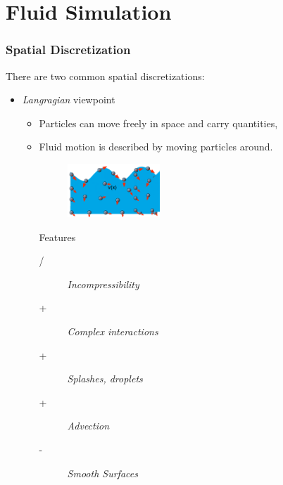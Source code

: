 \part{Fluid Simulation}
\begin{multicols}{2}
\section{Spatial Discretization}
There are two common spatial discretizations:
\begin{itemize}
	\item \emph{Langragian} viewpoint
		\begin{itemize}
			\item Particles can move freely in space and carry quantities,
			\item Fluid motion is described by moving particles around.
			\begin{figure}[H]
				\centering
				\includegraphics[width=0.35\textwidth,page=1]{img/05_spatial_discretization}
			\end{figure}
			Features
			\begin{description}
				\item[/] \emph{Incompressibility}
				\item[+] \emph{Complex interactions}
				\item[+] \emph{Splashes, droplets}
				\item[+] \emph{Advection}
				\item[-] \emph{Smooth Surfaces}
			

\end{description}
\end{itemize}
\end{itemize}
\end{multicols}
